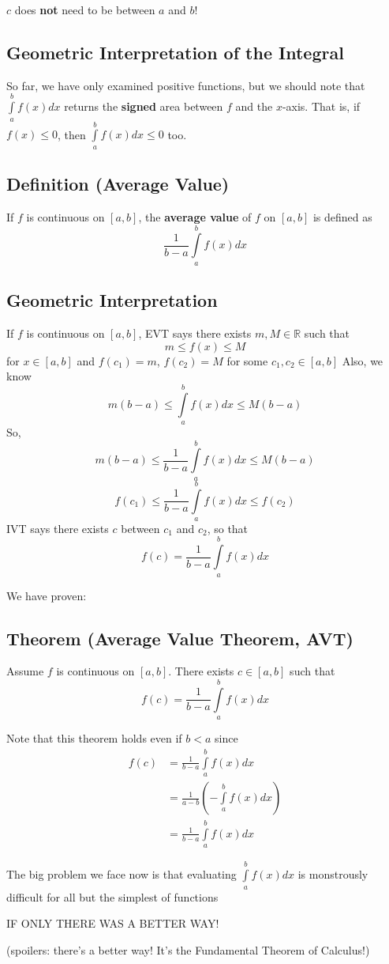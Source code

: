 \begin{remark}
    $ c $ does \textbf{not} need to be between $ a $ and $ b $!
\end{remark}

\subsection{Geometric Interpretation of the Integral}
So far, we have only examined positive functions, but we should note that $ \int\limits_{a}^{b} f(x)dx $
returns the \textbf{signed} area between $ f $ and the $ x $-axis. That is, if $ f(x)\le 0 $, then
$ \int\limits_{a}^{b} f(x)dx\le 0 $ too.

\subsection{Definition (Average Value)}
If $ f $ is continuous on $ [a,b] $, the \textbf{average value} of $ f $ on $ [a,b] $ is defined as
\[ \frac{1}{b-a} \int\limits_{a}^{b} f(x)dx \]

\subsection{Geometric Interpretation}
If $ f $ is continuous on $ [a,b] $, EVT says there exists $ m,M\in\mathbb{R} $ such that
\[m\le f(x) \le M\]
for $ x\in[a,b] $ and $ f(c_1)=m $, $ f(c_2)=M $ for some $ c_1,c_2\in[a,b] $
Also, we know \[ m(b-a)\le \int\limits_{a}^{b} f(x) d{x} \le M(b-a) \]
So,
\[ m(b-a)\le \frac{1}{b-a} \int\limits_{a}^{b} f(x) d{x} \le M(b-a) \]
\[ f(c_1)\le \frac{1}{b-a} \int\limits_{a}^{b} f(x) d{x} \le f(c_2) \]
IVT says there exists $ c $ between $ c_1 $ and $ c_2 $, so that
\[ f(c)=\frac{1}{b-a} \int\limits_{a}^{b} f(x) d{x} \]

We have proven:
\subsection{Theorem (Average Value Theorem, AVT)}
Assume $ f $ is continuous on $ [a,b] $. There exists $ c\in[a,b] $ such that
\[ f(c)=\frac{1}{b-a} \int\limits_{a}^{b} f(x) d{x} \]

\begin{remark}
    Note that this theorem holds even if $ b<a $ since
    \begin{align*}
        f(c) & =\frac{1}{b-a} \int\limits_{a}^{b} f(x) d{x}              \\
             & =\frac{1}{a-b}\left(-\int\limits_{a}^{b} f(x) d{x}\right) \\
             & =\frac{1}{b-a} \int\limits_{a}^{b} f(x) d{x}
    \end{align*}
\end{remark}

The big problem we face now is that evaluating $ \int\limits_{a}^{b} f(x) d{x} $ is
monstrously difficult for all but the simplest of functions\textellipsis{}

IF ONLY THERE WAS A BETTER WAY\@!

(spoilers: there's a better way! It's the Fundamental Theorem of Calculus!)

